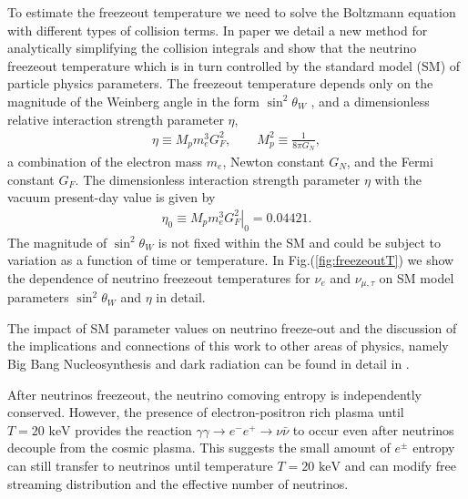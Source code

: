 \documentclass[universe,article,submit,moreauthors,pdftex,a4paper]{Definitions/mdpi}
\newcommand{\keV}{\text{ keV}}
\begin{document}
 To estimate the freezeout temperature we need to solve the Boltzmann equation with different types of collision terms. In paper \cite{Birrell:2014uka} we detail a new method for analytically simplifying the collision integrals and show that the neutrino freezeout temperature which is in turn controlled by the standard model (SM) of particle physics  parameters. The freezeout temperature depends only on the magnitude of the Weinberg angle in the form $\sin^2\theta_W$ , and a dimensionless relative interaction strength parameter $\eta$,
\begin{align}
\eta\equiv M_p m_e^3 G_F^2, \qquad M_p^2\equiv \frac{1}{8\pi G_N}, \end{align}
a combination of  the electron mass $m_e$, Newton constant $G_N$, and the Fermi constant $G_F$. The dimensionless interaction strength parameter $\eta$ with the vacuum present-day value is given by
\begin{align}
\eta_0\equiv \left.M_p m_e^3 G_F^2\right|_0  = 0.04421 .
\end{align}
The magnitude of  $\sin^2\theta_W$ is not fixed within the SM and  could be subject to variation as a function of time or temperature. In Fig.(\ref{fig:freezeoutT}) we show the dependence of neutrino freezeout temperatures for $\nu_e$ and $\nu_{\mu,\tau}$ on SM model parameters  $\sin^2\theta_W$ and $\eta$ in detail.

 The impact of SM parameter values on neutrino freeze-out and the discussion of the implications and connections of this work to other areas of physics, namely Big Bang Nucleosynthesis and dark radiation can be found in detail in \cite{Birrell:2014uka}.


 After neutrinos freezeout, the neutrino comoving entropy is independently conserved. However, the presence of electron-positron rich plasma until $T=20\keV$ provides the reaction $\gamma\gamma\to e^-e^+\to\nu\bar{\nu}$ to occur even after neutrinos decouple from the cosmic plasma. This suggests the small amount of $e^\pm$ entropy can still transfer to neutrinos until temperature $T=20\keV$ and can modify free streaming distribution and the effective number of neutrinos.
\end{document}
